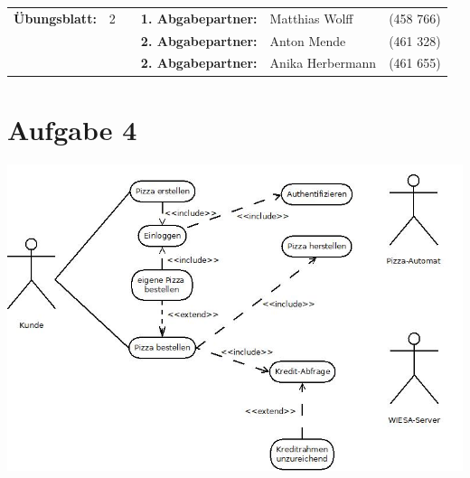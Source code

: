 \newcommand{\obenlinks}{Software Engineering}		%

\usepackage{float}


	\begin{center}
		\begin{tabular}{|rlp{4cm}rll|}
		\hline
		 \textbf{Übungsblatt:} & 2 &   & \textbf{1. Abgabepartner:} & Matthias Wolff & (458 766)  \\
		        & & & \textbf{2. Abgabepartner:} & Anton Mende & (461 328) \\
		        & & & \textbf{2. Abgabepartner:} & Anika Herbermann & (461 655) \\ \hline
		\end{tabular}
	\end{center}
\section*{Aufgabe 4}
\includegraphics[width=\textwidth,height=\textheight,keepaspectratio]{Aufgabe4.jpeg}
\pagebreak
